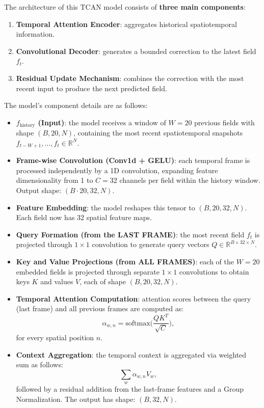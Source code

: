 \noindent The architecture of this TCAN model consists of \textbf{three main components}:
\begin{enumerate}
\item \textbf{Temporal Attention Encoder}: aggregates historical spatiotemporal information.
\item \textbf{Convolutional Decoder}: generates a bounded correction to the latest field $f_t$.
\item\textbf{Residual Update Mechanism}: combines the correction with the most recent input to produce the next predicted field.
\end{enumerate}
The model's component details are as follows:
\begin{itemize}
    \item \textbf{$f_{\text{history}}$ (Input)}: the model receives a window of $W=20$ previous fields with shape $(B, 20, N)$, containing the most recent spatiotemporal snapshots $f_{t-W+1}, \dots, f_t \in \mathbb{R}^N$.
    
    \item \textbf{Frame-wise Convolution (Conv1d + GELU)}: each temporal frame is processed independently by a 1D convolution, expanding feature dimensionality from 1 to $C = 32$ channels per field within the history window. Output shape: $(B \cdot 20, 32, N)$.
    
    \item \textbf{Feature Embedding}: the model reshapes this tensor to $(B, 20, 32, N)$. Each field now has $32$ spatial feature maps.
    
    \item \textbf{Query Formation (from the LAST FRAME)}: the most recent field $f_t$ is projected through $1 \times 1$ convolution to generate query vectors $Q \in \mathbb{R}^{B \times 32 \times N}$.
    
    \item \textbf{Key and Value Projections (from ALL FRAMES)}: each of the $W = 20$ embedded fields is projected through separate $1\times1$ convolutions to obtain keys $K$ and values $V$, each of shape $(B, 20, 32, N)$.
    
    \item \textbf{Temporal Attention Computation}: attention scores between the query (last frame) and all previous frames are computed as: $$\alpha_{w,n} = \mathrm{softmax}\big(\frac{QK^{T}}{\sqrt{C}}\big),$$ for every spatial position $n$.
    
    \item \textbf{Context Aggregation}: the temporal context is aggregated via weighted sum as follows: $$\sum_w \alpha_{w,n} V_w,$$ followed by a residual addition from the last-frame features and a Group Normalization. The output has shape: $(B, 32, N)$.
    

\end{itemize}
